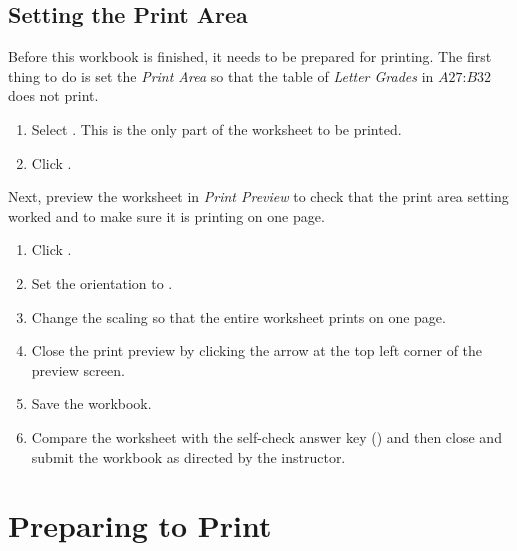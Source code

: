 \subsection{Setting the Print Area}

Before this workbook is finished, it needs to be prepared for printing. The first thing to do is set the \textit{Print Area} so that the table of \textit{Letter Grades} in $ A27 $:$ B32 $ does not print.

\begin{enumbox}
	\begin{enumerate}
		\item Select . This is the only part of the worksheet to be printed.
		\item Click .
	\end{enumerate}
\end{enumbox}

Next, preview the worksheet in \textit{Print Preview} to check that the print area setting worked and to make sure it is printing on one page.

\begin{enumbox}
	\begin{enumerate}
		\item Click .
		\item Set the orientation to .
		\item Change the scaling so that the entire worksheet prints on one page.
		\item Close the print preview by clicking the arrow at the top left corner of the preview screen.
		\item Save the  workbook.
		\item Compare the worksheet with the self-check answer key () and then close and submit the  workbook as directed by the instructor.
	\end{enumerate}
\end{enumbox}
	
\section{Preparing to Print}

